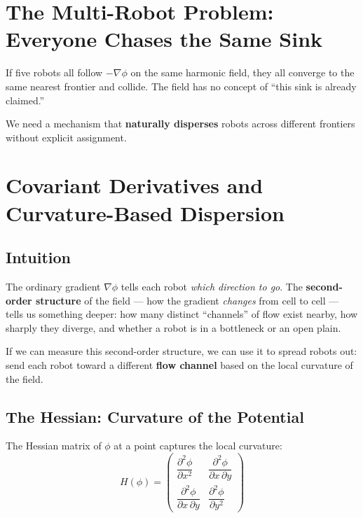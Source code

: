 \documentclass[11pt]{article}
\begin{document}
\section{The Multi-Robot Problem: Everyone Chases the Same Sink}

If five robots all follow $-\nabla\phi$ on the same harmonic field,
they all converge to the same nearest frontier and collide.  The
field has no concept of ``this sink is already claimed.''

We need a mechanism that \textbf{naturally disperses} robots across
different frontiers without explicit assignment.

\section{Covariant Derivatives and Curvature-Based Dispersion}

\subsection{Intuition}

The ordinary gradient $\nabla\phi$ tells each robot \emph{which
direction to go}.  The \textbf{second-order structure} of the
field --- how the gradient \emph{changes} from cell to cell ---
tells us something deeper: how many distinct ``channels'' of
flow exist nearby, how sharply they diverge, and whether a robot
is in a bottleneck or an open plain.

If we can measure this second-order structure, we can use it to
spread robots out: send each robot toward a different
\textbf{flow channel} based on the local curvature of the field.

\subsection{The Hessian: Curvature of the Potential}

The Hessian matrix of $\phi$ at a point captures the local curvature:
\begin{equation}
    H(\phi) = \begin{pmatrix}
    \dfrac{\partial^2\phi}{\partial x^2} &
    \dfrac{\partial^2\phi}{\partial x\,\partial y} \\[8pt]
    \dfrac{\partial^2\phi}{\partial x\,\partial y} &
    \dfrac{\partial^2\phi}{\partial y^2}
    \end{pmatrix}
    \label{eq:hessian}
\end{equation}
\end{document}
